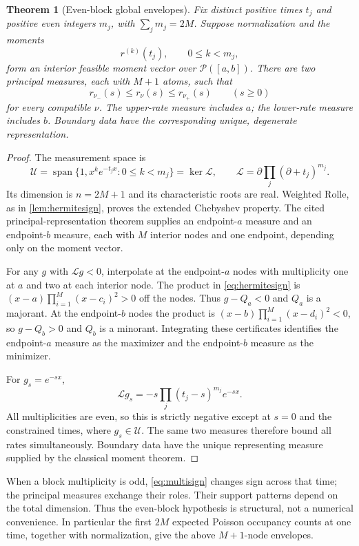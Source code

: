 \documentclass[11pt]{article}
\numberwithin{equation}{section}
\newtheorem{theorem}{Theorem}[section]
\theoremstyle{definition}
\theoremstyle{remark}
\newcommand{\Prob}{\mathcal P}
\newcommand{\Span}{\operatorname{span}}
\begin{document}
\begin{theorem}[Even-block global envelopes]\label{thm:evenblocks}
Fix distinct positive times $t_j$ and positive even integers $m_j$, with $\sum_jm_j=2M$. Suppose normalization and the moments
\[
 r^{(k)}(t_j),\qquad 0\le k<m_j,
\]
form an interior feasible moment vector over $\Prob([a,b])$. There are two principal measures, each with $M+1$ atoms, such that
\[
 r_{\nu_-}(s)\le r_\nu(s)\le r_{\nu_+}(s)\qquad(s\ge0)
\]
for every compatible $\nu$. The upper-rate measure includes $a$; the lower-rate measure includes $b$. Boundary data have the corresponding unique, degenerate representation.
\end{theorem}
\begin{proof}
The measurement space is
\[
 \mathcal U=\Span\{1,x^ke^{-t_jx}:0\le k<m_j\}
 =\ker\mathcal L,\qquad
 \mathcal L=\partial\prod_j(\partial+t_j)^{m_j}.
\]
Its dimension is $n=2M+1$ and its characteristic roots are real. Weighted Rolle, as in \cref{lem:hermitesign}, proves the extended Chebyshev property. The cited principal-representation theorem supplies an endpoint-$a$ measure and an endpoint-$b$ measure, each with $M$ interior nodes and one endpoint, depending only on the moment vector.

For any $g$ with $\mathcal Lg<0$, interpolate at the endpoint-$a$ nodes with multiplicity one at $a$ and two at each interior node. The product in \eqref{eq:hermitesign} is $(x-a)\prod_{i=1}^M(x-c_i)^2>0$ off the nodes. Thus $g-Q_a<0$ and $Q_a$ is a majorant. At the endpoint-$b$ nodes the product is $(x-b)\prod_{i=1}^M(x-d_i)^2<0$, so $g-Q_b>0$ and $Q_b$ is a minorant. Integrating these certificates identifies the endpoint-$a$ measure as the maximizer and the endpoint-$b$ measure as the minimizer.

For $g_s=e^{-sx}$,
\begin{equation}\label{eq:multisign}
 \mathcal Lg_s=-s\prod_j(t_j-s)^{m_j}e^{-sx}.
\end{equation}
All multiplicities are even, so this is strictly negative except at $s=0$ and the constrained times, where $g_s\in\mathcal U$. The same two measures therefore bound all rates simultaneously. Boundary data have the unique representing measure supplied by the classical moment theorem.
\end{proof}
When a block multiplicity is odd, \eqref{eq:multisign} changes sign across that time; the principal measures exchange their roles. Their support patterns depend on the total dimension. Thus the even-block hypothesis is structural, not a numerical convenience. In particular the first $2M$ expected Poisson occupancy counts at one time, together with normalization, give the above $M+1$-node envelopes.
\end{document}
